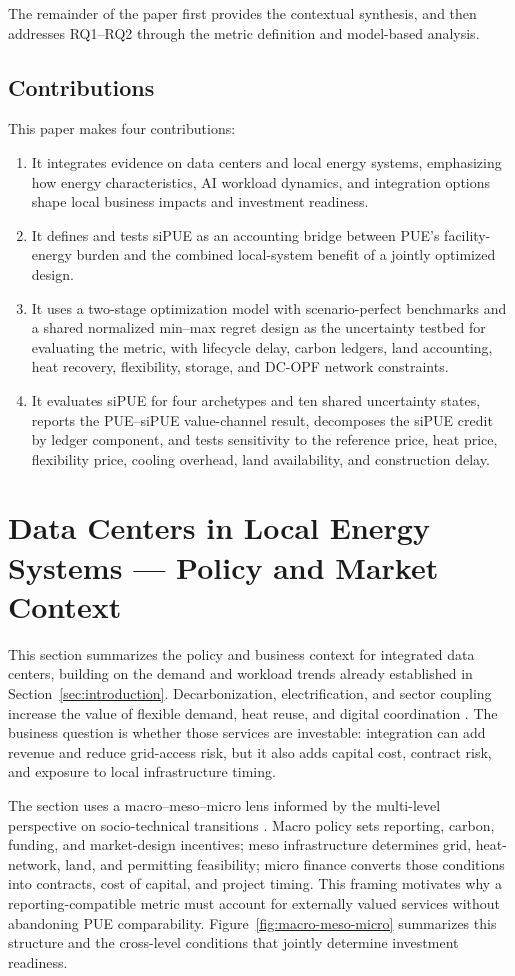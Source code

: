 \documentclass[preprint,12pt]{elsarticle}
\begin{document}
The remainder of the paper first provides the contextual synthesis, and then addresses RQ1--RQ2 through the metric definition and model-based analysis.

\subsection{Contributions}
This paper makes four contributions:
\begin{enumerate}
\item It integrates evidence on data centers and local energy systems, emphasizing how energy characteristics, AI workload dynamics, and integration options shape local business impacts and investment readiness.
\item It defines and tests siPUE as an accounting bridge between PUE's facility-energy burden and the combined local-system benefit of a jointly optimized design.
\item It uses a two-stage optimization model with scenario-perfect benchmarks and a shared normalized min--max regret design as the uncertainty testbed for evaluating the metric, with lifecycle delay, carbon ledgers, land accounting, heat recovery, flexibility, storage, and DC-OPF network constraints.
\item It evaluates siPUE for four archetypes and ten shared uncertainty states, reports the PUE--siPUE value-channel result, decomposes the siPUE credit by ledger component, and tests sensitivity to the reference price, heat price, flexibility price, cooling overhead, land availability, and construction delay.
\end{enumerate}

\section{Data Centers in Local Energy Systems --- Policy and Market Context}

This section summarizes the policy and business context for integrated data centers, building on the demand and workload trends already established in Section~\ref{sec:introduction}. Decarbonization, electrification, and sector coupling increase the value of flexible demand, heat reuse, and digital coordination \cite{7,8}. The business question is whether those services are investable: integration can add revenue and reduce grid-access risk, but it also adds capital cost, contract risk, and exposure to local infrastructure timing.

The section uses a macro--meso--micro lens informed by the multi-level perspective on socio-technical transitions \cite{GEELS2020119894}. Macro policy sets reporting, carbon, funding, and market-design incentives; meso infrastructure determines grid, heat-network, land, and permitting feasibility; micro finance converts those conditions into contracts, cost of capital, and project timing. This framing motivates why a reporting-compatible metric must account for externally valued services without abandoning PUE comparability. Figure~\ref{fig:macro-meso-micro} summarizes this structure and the cross-level conditions that jointly determine investment readiness.
\end{document}
